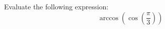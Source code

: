 \documentclass{ximera}
\author{David Kish}
\begin{document}
\begin{exercise}
Evaluate the following expression:
\[
\arccos(\cos(\frac{\pi}{3}))
\]
\begin{multipleChoice}
\end{multipleChoice}
\end{exercise}
\end{document}
